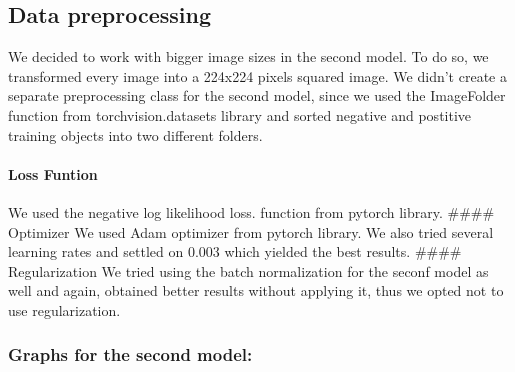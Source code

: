 \documentclass[11pt]{article}
\begin{document}
    \subsection{Data preprocessing}\label{data-preprocessing}

    We decided to work with bigger image sizes in the second model. To do
so, we transformed every image into a 224x224 pixels squared image. We
didn't create a separate preprocessing class for the second model, since
we used the ImageFolder function from torchvision.datasets library and
sorted negative and postitive training objects into two different
folders.

    \paragraph{Loss Funtion}\label{loss-funtion}

We used the negative log likelihood loss. function from pytorch library.
\#\#\#\# Optimizer We used Adam optimizer from pytorch library. We also
tried several learning rates and settled on 0.003 which yielded the best
results. \#\#\#\# Regularization We tried using the batch normalization
for the seconf model as well and again, obtained better results without
applying it, thus we opted not to use regularization.

    \subsubsection{Graphs for the second
model:}\label{graphs-for-the-second-model}
\end{document}
